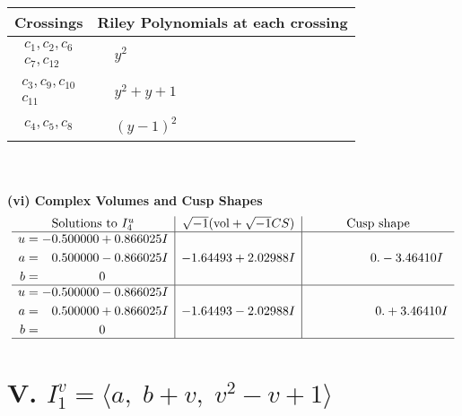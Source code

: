 \documentclass[1p]{elsarticle_modified}
\theoremstyle{definition}
\newcommand{\I}{\sqrt{-1}}
\begin{document}
\begin{tabular}{m{50pt}|m{274pt}}
Crossings & \hspace{64pt}Riley Polynomials at each crossing \\
\hline $$\begin{aligned}c_{1},c_{2},c_{6}\\c_{7},c_{12}\end{aligned}$$&$\begin{aligned}
&y^2
\end{aligned}$\\
\hline $$\begin{aligned}c_{3},c_{9},c_{10}\\c_{11}\end{aligned}$$&$\begin{aligned}
&y^2+y+1
\end{aligned}$\\
\hline $$\begin{aligned}c_{4},c_{5},c_{8}\end{aligned}$$&$\begin{aligned}
&(y-1)^2
\end{aligned}$\\
\hline
\end{tabular}\\~\\
\newpage\flushleft \textbf{(vi) Complex Volumes and Cusp Shapes}
$$\begin{array}{c|c|c}  
\text{Solutions to }I^u_{4}& \I (\text{vol} + \sqrt{-1}CS) & \text{Cusp shape}\\
 \hline 
\begin{aligned}
u &= -0.500000 + 0.866025 I \\
a &= \phantom{-}0.500000 - 0.866025 I \\
b &= \phantom{-0.000000 } 0\end{aligned}
 & -1.64493 + 2.02988 I & \phantom{-0.000000 } 0. - 3.46410 I \\ \hline\begin{aligned}
u &= -0.500000 - 0.866025 I \\
a &= \phantom{-}0.500000 + 0.866025 I \\
b &= \phantom{-0.000000 } 0\end{aligned}
 & -1.64493 - 2.02988 I & \phantom{-0.000000 -}0. + 3.46410 I\\
 \hline 
 \end{array}$$\newpage\newpage\renewcommand{\arraystretch}{1}
\centering \section*{V. $I^v_{1}= \langle a,\;b+v,\;v^2- v+1 \rangle$}
\end{document}
